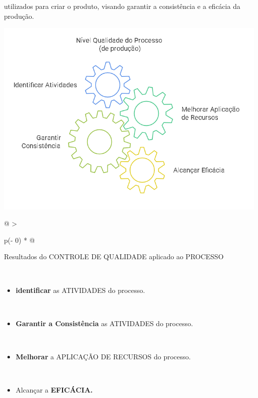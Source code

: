 \documentclass[
]{book}
\providecommand{\tightlist}{%
  \setlength{\itemsep}{0pt}\setlength{\parskip}{0pt}}
\begin{document}
utilizados para criar o produto, visando garantir a consistência e a eficácia da produção.

\includegraphics{images/qualidade-geral/Qualidade_do_Processo.png}

\begin{longtable}[]{@{}
  >{\raggedright\arraybackslash}p{(\columnwidth - 0\tabcolsep) * }@{}}
\toprule\noalign{}
\begin{minipage}[b]{\linewidth}\raggedright
Resultados do CONTROLE DE QUALIDADE aplicado ao PROCESSO
\end{minipage} \\
\midrule\noalign{}
\endhead
\bottomrule\noalign{}
\endlastfoot
\begin{minipage}[t]{\linewidth}\raggedright
\begin{itemize}
\tightlist
\item
  \textbf{identificar} as ATIVIDADES do processo.
\end{itemize}
\end{minipage} \\
\begin{minipage}[t]{\linewidth}\raggedright
\begin{itemize}
\tightlist
\item
  \textbf{Garantir a Consistência} as ATIVIDADES do processo.
\end{itemize}
\end{minipage} \\
\begin{minipage}[t]{\linewidth}\raggedright
\begin{itemize}
\tightlist
\item
  \textbf{Melhorar} a APLICAÇÃO DE RECURSOS do processo.
\end{itemize}
\end{minipage} \\
\begin{minipage}[t]{\linewidth}\raggedright
\begin{itemize}
\tightlist
\item
  Alcançar a \textbf{EFICÁCIA.}
\end{itemize}
\end{minipage} \\
\end{longtable}
\end{document}
